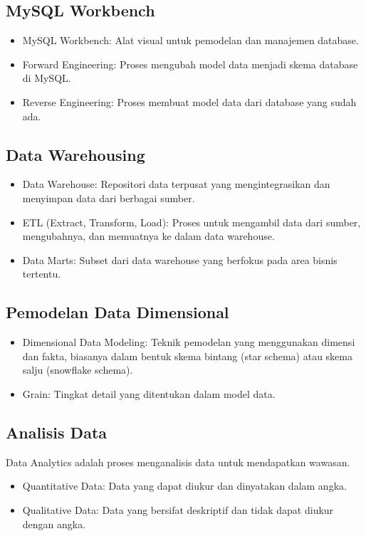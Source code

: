 \documentclass{article}
\begin{document}
\subsection{MySQL Workbench}
\begin{itemize}
    \item MySQL Workbench: Alat visual untuk pemodelan dan manajemen database.
    \item Forward Engineering: Proses mengubah model data menjadi skema database di MySQL.
    \item Reverse Engineering: Proses membuat model data dari database yang sudah ada.
\end{itemize}

\subsection{Data Warehousing}
\begin{itemize}
    \item Data Warehouse: Repositori data terpusat yang mengintegrasikan dan menyimpan data dari berbagai sumber.
    \item ETL (Extract, Transform, Load): Proses untuk mengambil data dari sumber, mengubahnya, dan memuatnya ke dalam data warehouse.
    \item Data Marts: Subset dari data warehouse yang berfokus pada area bisnis tertentu.
\end{itemize}

\subsection{Pemodelan Data Dimensional}
\begin{itemize}
    \item Dimensional Data Modeling: Teknik pemodelan yang menggunakan dimensi dan fakta, biasanya dalam bentuk skema bintang (star schema) atau skema salju (snowflake schema).
    \item Grain: Tingkat detail yang ditentukan dalam model data.
\end{itemize}

\subsection{Analisis Data}
Data Analytics adalah proses menganalisis data untuk mendapatkan wawasan.
\begin{itemize}
    \item Quantitative Data: Data yang dapat diukur dan dinyatakan dalam angka.
    \item Qualitative Data: Data yang bersifat deskriptif dan tidak dapat diukur dengan angka.
\end{itemize}
\end{document}
